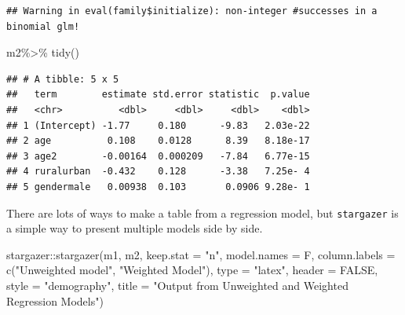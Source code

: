 \documentclass[
]{article}
\newenvironment{Shaded}{\begin{snugshade}}{\end{snugshade}}
\newcommand{\AttributeTok}[1]{\textcolor[rgb]{0.77,0.63,0.00}{#1}}
\newcommand{\ConstantTok}[1]{\textcolor[rgb]{0.00,0.00,0.00}{#1}}
\newcommand{\FunctionTok}[1]{\textcolor[rgb]{0.00,0.00,0.00}{#1}}
\newcommand{\NormalTok}[1]{#1}
\newcommand{\SpecialCharTok}[1]{\textcolor[rgb]{0.00,0.00,0.00}{#1}}
\newcommand{\StringTok}[1]{\textcolor[rgb]{0.31,0.60,0.02}{#1}}
\begin{document}
\begin{verbatim}
## Warning in eval(family$initialize): non-integer #successes in a binomial glm!
\end{verbatim}

\begin{Shaded}
\begin{Highlighting}[]
\NormalTok{m2}\SpecialCharTok{\%\textgreater{}\%}
  \FunctionTok{tidy}\NormalTok{()}
\end{Highlighting}
\end{Shaded}

\begin{verbatim}
## # A tibble: 5 x 5
##   term        estimate std.error statistic  p.value
##   <chr>          <dbl>     <dbl>     <dbl>    <dbl>
## 1 (Intercept) -1.77     0.180      -9.83   2.03e-22
## 2 age          0.108    0.0128      8.39   8.18e-17
## 3 age2        -0.00164  0.000209   -7.84   6.77e-15
## 4 ruralurban  -0.432    0.128      -3.38   7.25e- 4
## 5 gendermale   0.00938  0.103       0.0906 9.28e- 1
\end{verbatim}

There are lots of ways to make a table from a regression model, but \texttt{stargazer} \citep{stargazer} is a simple way to present multiple models side by side.

\begin{Shaded}
\begin{Highlighting}[]
\NormalTok{stargazer}\SpecialCharTok{::}\FunctionTok{stargazer}\NormalTok{(m1, m2,}
                     \AttributeTok{keep.stat =} \StringTok{"n"}\NormalTok{,}
                     \AttributeTok{model.names =}\NormalTok{ F,}
                     \AttributeTok{column.labels =} \FunctionTok{c}\NormalTok{(}\StringTok{"Unweighted model"}\NormalTok{, }\StringTok{"Weighted Model"}\NormalTok{),}
                     \AttributeTok{type =} \StringTok{"latex"}\NormalTok{,}
                     \AttributeTok{header =} \ConstantTok{FALSE}\NormalTok{, }
                     \AttributeTok{style =} \StringTok{"demography"}\NormalTok{,}
                     \AttributeTok{title =} \StringTok{"Output from Unweighted and Weighted Regression Models"}\NormalTok{)}
\end{Highlighting}
\end{Shaded}
\end{document}
